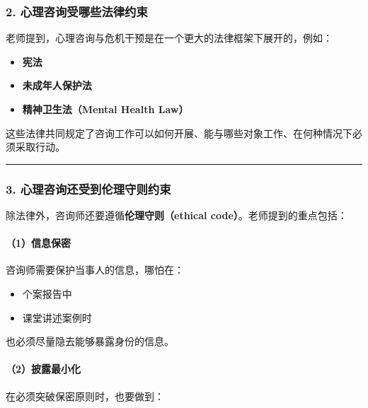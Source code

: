 \documentclass[
  chinese,
  9pt,
  a4paper,
]{ctexart}
\providecommand{\tightlist}{%
  \setlength{\itemsep}{0pt}\setlength{\parskip}{0pt}}
\begin{document}
\subsubsection{2.
心理咨询受哪些法律约束}\label{ux5fc3ux7406ux54a8ux8be2ux53d7ux54eaux4e9bux6cd5ux5f8bux7ea6ux675f}

老师提到，心理咨询与危机干预是在一个更大的法律框架下展开的，例如：

\begin{itemize}
\tightlist
\item
  \textbf{宪法}
\item
  \textbf{未成年人保护法}
\item
  \textbf{精神卫生法（Mental Health Law）}
\end{itemize}

这些法律共同规定了咨询工作可以如何开展、能与哪些对象工作、在何种情况下必须采取行动。

\begin{center}\rule{0.5\linewidth}{0.5pt}\end{center}

\subsubsection{3.
心理咨询还受到伦理守则约束}\label{ux5fc3ux7406ux54a8ux8be2ux8fd8ux53d7ux5230ux4f26ux7406ux5b88ux5219ux7ea6ux675f}

除法律外，咨询师还要遵循\textbf{伦理守则（ethical
code）}。老师提到的重点包括：

\paragraph{（1）信息保密}\label{ux4fe1ux606fux4fddux5bc6}

咨询师需要保护当事人的信息，哪怕在：

\begin{itemize}
\tightlist
\item
  个案报告中
\item
  课堂讲述案例时
\end{itemize}

也必须尽量隐去能够暴露身份的信息。

\paragraph{（2）披露最小化}\label{ux62abux9732ux6700ux5c0fux5316}

在必须突破保密原则时，也要做到：
\end{document}
